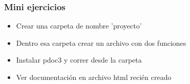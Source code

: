 \documentclass[14pt,aspectratio=169,xcolor=dvipsnames]{beamer}
\begin{document}
\begin{frame}[noframenumbering]\frametitle{Mini ejercicios}
    \begin{itemize}
        \item Crear una carpeta de nombre 'proyecto'
        \item Dentro esa carpeta crear un archivo con dos funciones
        \item Instalar pdoc3 y correr  desde la carpeta
        \item Ver documentación en archivo html recién creado
    \end{itemize}
\end{frame}
\end{document}
